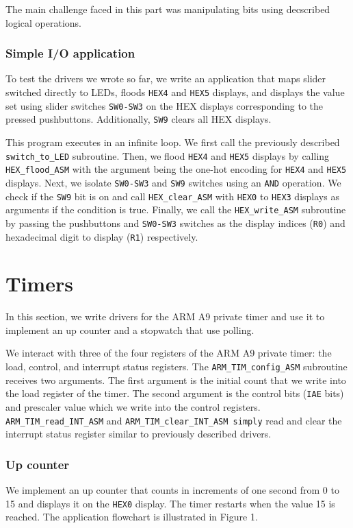 \documentclass[10pt]{article}
\begin{document}
The main challenge faced in this part was manipulating bits using decscribed logical operations.
\subsubsection*{Simple I/O application}
To test the drivers we wrote so far, we write an application that maps slider switched directly to LEDs, floods \verb+HEX4+ and \verb+HEX5+ displays, and displays the value set using slider switches \verb+SW0-SW3+ on the HEX displays corresponding to the pressed pushbuttons. Additionally, \verb+SW9+ clears all HEX displays.

This program executes in an infinite loop. We first call the previously described \verb+switch_to_LED+ subroutine. Then, we flood \verb+HEX4+ and \verb+HEX5+ displays by calling \verb+HEX_flood_ASM+ with the argument being the one-hot encoding for \verb+HEX4+ and \verb+HEX5+ displays. Next, we isolate \verb+SW0-SW3+ and \verb+SW9+ switches using an \verb+AND+ operation. We check if the \verb+SW9+ bit is on and call \verb+HEX_clear_ASM+ with \verb+HEX0+ to \verb+HEX3+ displays as arguments if the condition is true. Finally, we call the \verb+HEX_write_ASM+ subroutine by passing the pushbuttons and \verb+SW0-SW3+ switches as the display indices (\verb+R0+) and hexadecimal digit to display (\verb+R1+) respectively.

\section{Timers}
In this section, we write drivers for the ARM A9 private timer and use it to implement an up counter and a stopwatch that use polling.

We interact with three of the four registers of the ARM A9 private timer: the load, control, and interrupt status registers. The \verb+ARM_TIM_config_ASM+ subroutine receives two arguments. The first argument is the initial count that we write into the load register of the timer. The second argument is the control bits (\verb+IAE+ bits) and prescaler value which we write into the control registers. \verb+ARM_TIM_read_INT_ASM+ and \verb+ARM_TIM_clear_INT_ASM simply+ read and clear the interrupt status register similar to previously described drivers.

\subsubsection*{Up counter}
We implement an up counter that counts in increments of one second from 0 to 15 and displays it on the \verb+HEX0+ display. The timer restarts when the value 15 is reached. The application flowchart is illustrated in Figure 1.
\end{document}
